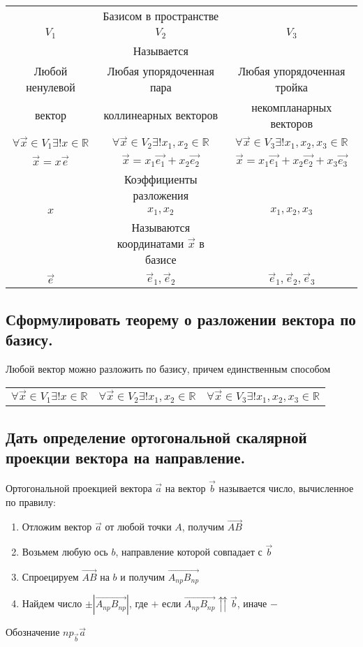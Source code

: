 \documentclass[a4paper, 10pt]{article}
\newcommand{\bvec}[1]{\overrightarrow{#1}}
\newcommand{\mcolt}[1]{&#1&}
\renewcommand{\a}{\vec{a}}
\renewcommand{\b}{\vec{b}}
\begin{document}
\begin{center}
\begin{tabular}{c c c} 
    \mcolt{Базисом в пространстве}\\
    $V_1$&$V_2$&$V_3$\\
    \mcolt{Называется}\\
    Любой ненулевой & Любая упорядоченная пара & Любая упорядоченная тройка\\
    вектор & коллинеарных векторов & некомпланарных векторов\\
    $\forall \vec{x} \in V_1 \exists ! x \in \mathbb{R}$&
    $\forall \vec{x} \in V_2 \exists ! x_1, x_2 \in \mathbb{R}$&
    $\forall \vec{x} \in V_3 \exists ! x_1, x_2, x_3 \in \mathbb{R}$\\
    $\vec{x} = x\vec{e}$ & $\vec{x} = x_1\vec{e_1} + x_2\vec{e_2}$ &
    $\vec{x} = x_1\vec{e_1} + x_2\vec{e_2} + x_3\vec{e_3}$\\
    \mcolt{Коэффициенты разложения}\\
    $x$&$x_1, x_2$&$x_1, x_2, x_3$\\
    \mcolt{Называются координатами $\vec{x}$ в базисе}\\
    $\vec{e}$&$\vec{e}_1, \vec{e}_2$&$\vec{e}_1, \vec{e}_2, \vec{e}_3$\\
\end{tabular}
\end{center}

\subsection{Сформулировать теорему о разложении вектора по базису.}

\begin{center}
Любой вектор можно разложить по базису, причем единственным способом
\begin{tabular}{c c c} 
    $\forall \vec{x} \in V_1 \exists ! x \in \mathbb{R}$&
    $\forall \vec{x} \in V_2 \exists ! x_1, x_2 \in \mathbb{R}$&
    $\forall \vec{x} \in V_3 \exists ! x_1, x_2, x_3 \in \mathbb{R}$\\
\end{tabular}
\end{center}

\subsection{Дать определение ортогональной скалярной проекции вектора на направление.}

Ортогональной проекцией вектора $\a$ на вектор $\b$ называется число, вычисленное по правилу:
\begin{enumerate}
    \item Отложим вектор $\a$ от любой точки $A$, получим $\bvec{AB}$
    \item Возьмем любую ось $b$, направление которой совпадает с $\b$
    \item Спроецируем $\bvec{AB}$ на $b$ и получим  $\bvec{A_{np}B_{np}}$
    \item Найдем число $\pm |\bvec{A_{np}B_{np}}|$, где $+$ если $\bvec{A_{np}B_{np}} \upuparrows \b$, иначе $-$
\end{enumerate}
Обозначение $np_{\b} \a$
\end{document}
